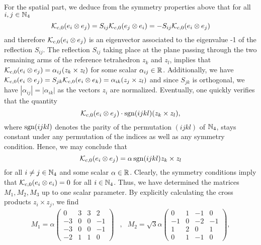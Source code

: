 For the spatial part, we deduce from the symmetry properties above that for all $i, j \in \mathbb{N}_4$	
\begin{equation}
	\mathcal{K}_{c,0}(e_i \otimes e_j) = S_{ij} \mathcal{K}_{c,0}(e_j \otimes e_i) = -S_{ij} \mathcal{K}_{c,0}(e_i \otimes e_j)
\end{equation}
and therefore $\mathcal{K}_{c,0}(e_i \otimes e_j)$ is an eigenvector associated to the eigenvalue -1 of the reflection $S_{ij}$. The reflection $S_{ij}$ taking place at the plane passing through the two remaining arms of the reference tetrahedron $z_k$ and $z_l$, implies that $\mathcal{K}_{c,0}(e_i \otimes e_j) = \alpha_{ij}( z_k \times z_l)$ for some scalar $\alpha_{ij} \in \mathbb{R}$. Additionally, we have $\mathcal{K}_{c,0}(e_i \otimes e_j) = S_{jk} \mathcal{K}_{c,0}(e_i \otimes e_k) = \alpha_{ik}(z_j \times z_l)$ and since $S_{jk}$ is orthogonal, we have $|\alpha_{ij}| = |\alpha_{ik}|$ as the vectors $z_i$ are normalized. Eventually, one quickly verifies that the quantity
\begin{equation}
	\mathcal{K}_{c,0}(e_i \otimes e_j) \cdot \operatorname{sgn}(ijkl) (z_k \times z_l),
\end{equation}
where $\operatorname{sgn}(ijkl)$ denotes the parity of the permutation $(ijkl)$ of $\mathbb{N}_4$, stays constant under any permutation of the indices as well as any symmetry condition. Hence, we may conclude that
\begin{equation}
	\mathcal{K}_{c,0}(e_i \otimes e_j) = \alpha \operatorname{sgn}(ijkl) z_k \times z_l
\end{equation}
for all $i \neq j \in \mathbb{N}_4$ and some scalar $\alpha \in \mathbb{R}$. Clearly, the symmetry conditions imply that $\mathcal{K}_{c,0}(e_i \otimes e_i) = 0$ for all $i \in  \mathbb{N}_4$. Thus, we have determined the matrices $M_1, M_2, M_3$ up to one scalar parameter. By explicitly calculating the cross products $z_i \times z_j$, we find
\renewcommand{\arraystretch}{1.1}
\begin{align}
\label{eq: M1 and M2}
M_1 = \alpha \left ( \begin{array}{cccc}
0 & 3 & 3 & 2 \\ 
-3 & 0 & 0 & -1 \\ 
-3 & 0 & 0 & -1 \\ 
-2 & 1 & 1 & 0
\end{array} \right ) &, &
M_2 = \sqrt{3} \alpha \left (
\begin{array}{cccc}
0 & 1 & -1 & 0 \\ 
-1 & 0 & -2 & -1 \\ 
1 & 2 & 0 & 1 \\ 
0 & 1 & -1 & 0
\end{array} \right),
\end{align}
